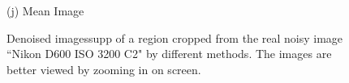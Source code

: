 \documentclass[10pt,onecolumn,letterpaper]{article}
\begin{document}
\begin{figure}[H]
{\begin{minipage}[t]{0.196\textwidth}
{\footnotesize (j) Mean Image \cite{crosschannel2016} }
\end{minipage}
}
\caption{Denoised imagessupp of a region cropped from the real noisy image ``Nikon D600 ISO 3200 C2" \cite{crosschannel2016} by different methods. The images are better viewed by zooming in on screen.} 
\label{fig13}
\end{figure}

{\small


}
\end{document}

